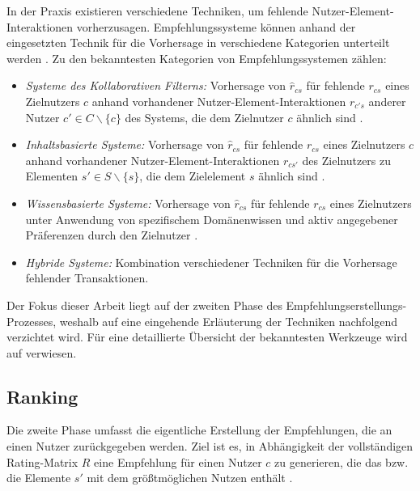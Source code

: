 In der Praxis existieren verschiedene Techniken, um fehlende Nutzer-Ele\-ment-Interaktionen vorherzusagen.
Empfehlungssysteme können anhand der eingesetzten Technik für die Vorhersage in verschiedene Kategorien unterteilt werden \cite[S. 8 ff.]{recommenderSystems:2016}.
Zu den bekanntesten Kategorien von Empfehlungssystemen zählen:
\begin{itemize}
	\item \textit{Systeme des Kollaborativen Filterns:} Vorhersage von $\hat{r}_{cs}$ für fehlende $r_{cs}$ eines Zielnutzers $c$ anhand vorhandener Nutzer-Ele\-ment-Interaktionen $r_{c's}$ anderer Nutzer $c' \in C \backslash \{c\}$ des Systems, die dem Zielnutzer $c$ ähnlich sind \cite[S. 737]{adomavicius:inproceedings}.
	\item \textit{Inhaltsbasierte Systeme:} Vorhersage von $\hat{r}_{cs}$ für fehlende $r_{cs}$ eines Zielnutzers $c$ anhand vorhandener Nutzer-Ele\-ment-Interaktionen $r_{cs'}$ des Zielnutzers zu Elementen $s' \in S \backslash \{s\}$, die dem Zielelement $s$ ähnlich sind \cite[S. 735]{adomavicius:inproceedings}.
	\item \textit{Wissensbasierte Systeme:} Vorhersage von $\hat{r}_{cs}$ für fehlende $r_{cs}$ eines Zielnutzers unter Anwendung von spezifischem Domänenwissen und aktiv angegebener Präferenzen durch den Zielnutzer \cite[S. 16f.]{recommenderSystems:2016}.
	\item \textit{Hybride Systeme:} Kombination verschiedener Techniken für die Vorhersage fehlender Transaktionen.
\end{itemize}

Der Fokus dieser Arbeit liegt auf der zweiten Phase des Empfehlungserstel\-lungs-Prozesses, weshalb auf eine eingehende Erläuterung der Techniken nachfolgend verzichtet wird.
Für eine detaillierte Übersicht der bekanntesten Werkzeuge wird auf \textcite[S. 8ff.]{recommenderSystems:2016} verwiesen.

\subsection{Ranking}
\label{ch:empfehlungssysteme:empfehlungserstellung:recommendation}
Die zweite Phase umfasst die eigentliche Erstellung der Empfehlungen, die an einen Nutzer zurückgegeben werden.
Ziel ist es, in Abhängigkeit der vollständigen Rating-Matrix $R$ eine Empfehlung für einen Nutzer $c$ zu generieren, die das bzw. die Elemente $s'$ mit dem größtmöglichen Nutzen enthält \cite[S. 898]{adomavicius:article}\cite[S. 87]{ekstrand:article}.

